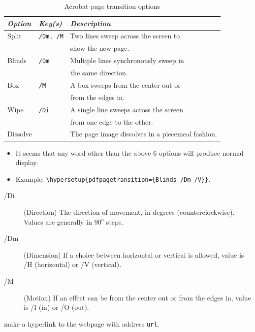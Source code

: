 \documentclass[landscape, headrule, footrule]{foils}
\begin{document}
\begin{table}[ht]
\caption{Acrobat page transition options}
\label{transition}
{
\begin{tabular}{lll}
\hline
\textit{Option}&\textit{Key(s)}&\textit{Description}\\
\hline
Split&\verb+/Dm, /M+ & Two lines sweep across the screen to \\
     &               & show the new page.\\
Blinds&\verb+/Dm+& Multiple lines synchronously sweep in \\
     &           & the same direction.\\
Box &\verb+/M+& A box sweeps from the center out or \\
    &         & from the edges in.\\
Wipe &\verb+/Di+& A single line sweeps across the screen \\
     &          &from one edge to the other.\\
Dissolve&& { The page image dissolves in a piecemeal fashion}.\\
\hline
\end{tabular}
}
\begin{itemize}
  \item {It seems that any word other than the above 6 options
will produce normal display.}
  \item Example: \verb+\hypersetup{pdfpagetransition={Blinds /Dm /V}}+. 
\end{itemize}


\end{table}
{
\begin{description}
  \item[/Di] (Direction) The direction of movement, in degrees (counterclockwise). Values are
generally in $90^o$ steps.
  \item[/Dm] (Dimension) If a choice between horizontal or vertical is allowed, value is
/H (horizontal) or /V (vertical).
  \item[/M] (Motion) If an effect can be from the center out or from the edges in, value is
/I (in) or /O (out).
\end{description}
}



 make a hyperlink to the webpage with address \texttt{url}.
\end{document}
